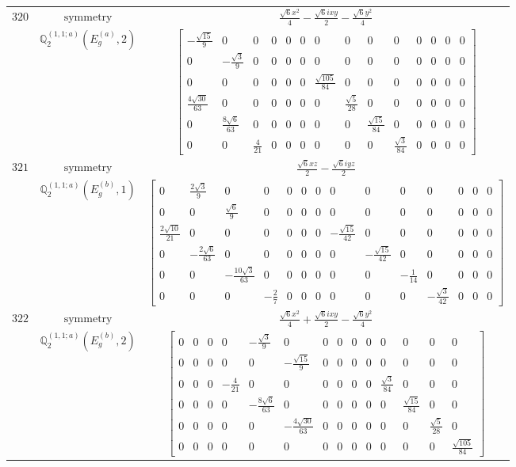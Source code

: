 \documentclass[fleqn,8pt,landscape]{jsarticle}
\begin{document}
\begin{longtable}{ccc}
$ 320 $ & $ \text{symmetry} $ & $ \frac{\sqrt{6} x^{2}}{4} - \frac{\sqrt{6} i x y}{2} - \frac{\sqrt{6} y^{2}}{4} $ \\
$  $ & $ \mathbb{Q}_{2}^{(1,1;a)}(E_{g}^{(a)},2) $ & $ \begin{bmatrix} - \frac{\sqrt{15}}{9} & 0 & 0 & 0 & 0 & 0 & 0 & 0 & 0 & 0 & 0 & 0 & 0 & 0 \\ 0 & - \frac{\sqrt{3}}{9} & 0 & 0 & 0 & 0 & 0 & 0 & 0 & 0 & 0 & 0 & 0 & 0 \\ 0 & 0 & 0 & 0 & 0 & 0 & \frac{\sqrt{105}}{84} & 0 & 0 & 0 & 0 & 0 & 0 & 0 \\ \frac{4 \sqrt{30}}{63} & 0 & 0 & 0 & 0 & 0 & 0 & \frac{\sqrt{5}}{28} & 0 & 0 & 0 & 0 & 0 & 0 \\ 0 & \frac{8 \sqrt{6}}{63} & 0 & 0 & 0 & 0 & 0 & 0 & \frac{\sqrt{15}}{84} & 0 & 0 & 0 & 0 & 0 \\ 0 & 0 & \frac{4}{21} & 0 & 0 & 0 & 0 & 0 & 0 & \frac{\sqrt{3}}{84} & 0 & 0 & 0 & 0 \end{bmatrix} $ \\ \hline
$ 321 $ & $ \text{symmetry} $ & $ \frac{\sqrt{6} x z}{2} - \frac{\sqrt{6} i y z}{2} $ \\
$  $ & $ \mathbb{Q}_{2}^{(1,1;a)}(E_{g}^{(b)},1) $ & $ \begin{bmatrix} 0 & \frac{2 \sqrt{3}}{9} & 0 & 0 & 0 & 0 & 0 & 0 & 0 & 0 & 0 & 0 & 0 & 0 \\ 0 & 0 & \frac{\sqrt{6}}{9} & 0 & 0 & 0 & 0 & 0 & 0 & 0 & 0 & 0 & 0 & 0 \\ \frac{2 \sqrt{10}}{21} & 0 & 0 & 0 & 0 & 0 & 0 & - \frac{\sqrt{15}}{42} & 0 & 0 & 0 & 0 & 0 & 0 \\ 0 & - \frac{2 \sqrt{6}}{63} & 0 & 0 & 0 & 0 & 0 & 0 & - \frac{\sqrt{15}}{42} & 0 & 0 & 0 & 0 & 0 \\ 0 & 0 & - \frac{10 \sqrt{3}}{63} & 0 & 0 & 0 & 0 & 0 & 0 & - \frac{1}{14} & 0 & 0 & 0 & 0 \\ 0 & 0 & 0 & - \frac{2}{7} & 0 & 0 & 0 & 0 & 0 & 0 & - \frac{\sqrt{3}}{42} & 0 & 0 & 0 \end{bmatrix} $ \\ \hline
$ 322 $ & $ \text{symmetry} $ & $ \frac{\sqrt{6} x^{2}}{4} + \frac{\sqrt{6} i x y}{2} - \frac{\sqrt{6} y^{2}}{4} $ \\
$  $ & $ \mathbb{Q}_{2}^{(1,1;a)}(E_{g}^{(b)},2) $ & $ \begin{bmatrix} 0 & 0 & 0 & 0 & - \frac{\sqrt{3}}{9} & 0 & 0 & 0 & 0 & 0 & 0 & 0 & 0 & 0 \\ 0 & 0 & 0 & 0 & 0 & - \frac{\sqrt{15}}{9} & 0 & 0 & 0 & 0 & 0 & 0 & 0 & 0 \\ 0 & 0 & 0 & - \frac{4}{21} & 0 & 0 & 0 & 0 & 0 & 0 & \frac{\sqrt{3}}{84} & 0 & 0 & 0 \\ 0 & 0 & 0 & 0 & - \frac{8 \sqrt{6}}{63} & 0 & 0 & 0 & 0 & 0 & 0 & \frac{\sqrt{15}}{84} & 0 & 0 \\ 0 & 0 & 0 & 0 & 0 & - \frac{4 \sqrt{30}}{63} & 0 & 0 & 0 & 0 & 0 & 0 & \frac{\sqrt{5}}{28} & 0 \\ 0 & 0 & 0 & 0 & 0 & 0 & 0 & 0 & 0 & 0 & 0 & 0 & 0 & \frac{\sqrt{105}}{84} \end{bmatrix} $ \\ \hline

\end{longtable}
\end{document}
